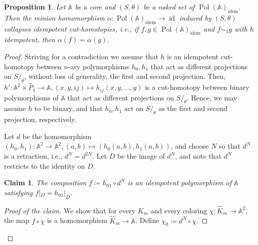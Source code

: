 \documentclass[10pt,a4paper]{amsart}
\newtheorem{proposition}{Proposition}
\newtheorem{claim}{Claim}
\DeclareMathOperator{\id}{id}
\newcommand{\idem}{\mathrm{idem}}
\newcommand{\pol}{\operatorname{Pol}}
\newcommand{\str}[1]{\mathbb{#1}}
\begin{document}
\begin{proposition}
\label{prop:noHomotopies}
    Let $\str A$ be a core and $(S,\theta)$ be a naked set of $\pol(\str A)_\idem$. Then the minion homomorphism $\alpha\colon \pol(\str A)_\idem\to\id$ induced by $(S, \theta)$ collapses idempotent cut-homotopies, i.e., if $f,g\in\pol(\str A)_\idem$ and $f\sim_1 g$ with $h$ idempotent, then $\alpha(f)=\alpha(g)$.
\end{proposition}

\begin{proof}

Striving for a contradiction we assume that $h$ is an idempotent cut-homotopy between $n$-ary polymorphisms $h_0,h_1$ that act as different projections on $S/_\theta$, without loss of generality, the first and second projection. Then, $h' \colon \str A^2 \times \hat P_1 \to \str A, (x,y,ij) \mapsto h_{ij}(x,y,\dots, y)$ is a cut-homotopy between binary polymorphisms of $\str A$ that act as different projections on $S/_\theta$. Hence, we may assume $h$ to be binary, and that $h_0, h_1$ act on $S/_\theta$ as the first and second projection, respectively.



Let $d$ be the homomorphism $(h_0, h_1) \colon \str A^2\to \str A^2, (a,b) \mapsto (h_0(a,b),h_1(a,b))$, and choose $N$ so that $d^N$ is a retraction, i.e., $d^N = d^{2N}$. Let $D$ be the image of $d^N$, and note that $d^N$ restricts to the identity on $D$.

\begin{claim}
The composition $f\coloneq h_{01}\circ d^N$ is an idempotent polymorphism of $\str A$ satisfying $f|_D = h_{01}|_D$.
\end{claim}
\begin{proof}[Proof of the claim]
We show that for every $K_m$ and every coloring $\chi\colon \hat K_m\to \str A^2$, 
the map $f \circ \chi$ is a homomorphism $\hat K_m \to \str A$.
Define $\chi_0\coloneq d^N\circ \chi$.


\end{proof}
\end{proof}
\end{document}
